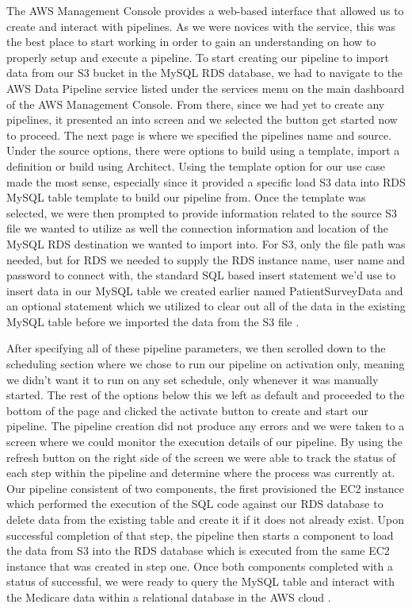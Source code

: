 The AWS Management Console provides a web-based interface that allowed us to 
create and interact with pipelines. As we were novices with the service, 
this was the best place to start working in order to gain an understanding on 
how to properly setup and execute a pipeline. To start creating our pipeline 
to import data from our S3 bucket in the MySQL RDS database, we had to 
navigate to the AWS Data Pipeline service listed under the services menu on 
the main dashboard of the AWS Management Console. From there, since we had yet 
to create any pipelines, it presented an into screen and we selected the 
button get started now to proceed. The next page is where we specified the 
pipelines name and source. Under the source options, there were options to 
build using a template, import a definition or build using Architect. Using 
the template option for our use case made the most sense, especially since it 
provided a specific load S3 data into RDS MySQL table template to build our 
pipeline from. Once the template was selected, we were then prompted to 
provide information related to the source S3 file we wanted to utilize as well 
the connection information and location of the MySQL RDS destination we wanted 
to import into. For S3, only the file path was needed, but for RDS we needed 
to supply the RDS instance name, user name and password to connect with, the 
standard SQL based insert statement we'd use to insert data in our MySQL table 
we created earlier named PatientSurveyData and an optional statement which we 
utilized to clear out all of the data in the existing MySQL table before we 
imported the data from the S3 file \cite{hid-sp18-521-datapipelinestarting}. 

After specifying all of these pipeline parameters, we then scrolled down to 
the scheduling section where we chose to run our pipeline on activation only, 
meaning we didn't want it to run on any set schedule, only whenever it was 
manually started. The rest of the options below this we left as default and 
proceeded to the bottom of the page and clicked the activate button to create 
and start our pipeline. The pipeline creation did not produce any errors and 
we were taken to a screen where we could monitor the execution details of our 
pipeline. By using the refresh button on the right side of the screen we were 
able to track the status of each step within the pipeline and determine where 
the process was currently at. Our pipeline consistent of two components, the 
first provisioned the EC2 instance which performed the execution of the SQL 
code against our RDS database to delete data from the existing table and 
create it if it does not already exist. Upon successful completion of that 
step, the pipeline then starts a component to load the data from S3 into the 
RDS database which is executed from the same EC2 instance that was created in 
step one. Once both components completed with a status of successful, we were 
ready to query the MySQL table and interact with the Medicare data within a 
relational database in the AWS cloud \cite{hid-sp18-521-datapipelinestarting}. 

